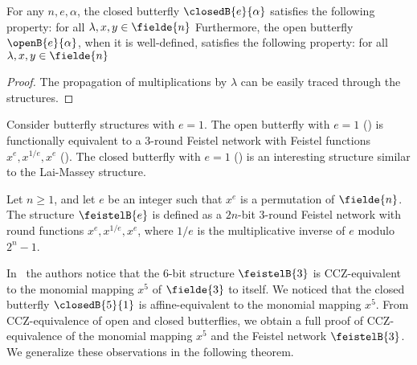 \begin{proposition}
For any $n,e,\alpha$, the closed butterfly $\closedB{e}{\alpha}$ satisfies the following property: for all $\lambda,x,y \in \fielde{n}$
Furthermore, the open butterfly $\openB{e}{\alpha}$, when it is well-defined, satisfies the following property: for all $\lambda,x,y \in \fielde{n}$
\end{proposition}
\begin{proof}
The propagation of multiplications by $\lambda$ can be easily traced through the structures.
\end{proof}



Consider butterfly structures with $e=1$. The open butterfly with $e=1$ () is functionally equivalent to a 3-round Feistel network with Feistel functions $x^e, x^{1/e}, x^e$ (). The closed butterfly with $e=1$ () is an interesting structure similar to the Lai-Massey structure.

\begin{definition}
  Let $n \ge 1$, and let $e$ be an integer such that $x^e$ is a permutation of $\fielde{n}$. The structure $\feistelB{e}$ is defined as a $2n$-bit 3-round Feistel network with round functions $x^e, x^{1/e},x^e$, where $1/e$ is the multiplicative inverse of $e$ modulo $2^n-1$.
\end{definition}


In~\cite{SboxFeistel} the authors notice that the 6-bit structure $\feistelB{3}$ is CCZ-equivalent to the monomial mapping $x^5$ of $\fielde{3}$ to itself. We noticed that the closed butterfly $\closedB{5}{1}$ is affine-equivalent to the monomial mapping $x^5$. From CCZ-equivalence of open and closed butterflies, we obtain a full proof of CCZ-equivalence of the monomial mapping $x^5$ and the Feistel network $\feistelB{3}$. We generalize these observations in the following theorem.


